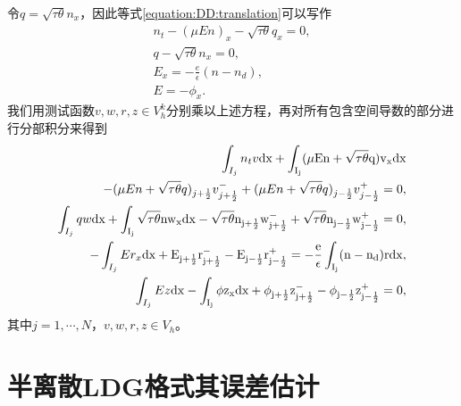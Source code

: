 令$q = \sqrt{\tau \theta }n_x$，因此等式\eqref{equation:DD:translation}可以写作
\begin{align}
    n_t - (\mu E n)_x - \sqrt{\tau \theta}q_x = 0, \\
    q - \sqrt{\tau \theta}n_x = 0,                 \\
    E_x = -\frac{e}{\epsilon}(n - n_d),            \\
    E = - \phi_x.
\end{align}
我们用测试函数$v,w,r,z \in V_h^k$分别乘以上述方程，再对所有包含空间导数的部分进行分部积分来得到
\begin{align}
    \int_{I_j} n_t v \rm{d}x + \int_{I_j}(\mu En + \sqrt{\tau \theta}q)v_x\rm{d} x          \nonumber                                                                                                                         \\
    - (\mu En + \sqrt{\tau \theta}q)_{j+\frac{1}{2}}v_{j+\frac{1}{2}}^- +(\mu En + \sqrt{\tau \theta}q)_{j-\frac{1}{2}}v_{j-\frac{1}{2}}^+ = 0, \label{weakForm:1:translation}                                                \\
    \int_{I_j} qw\rm{d}x + \int_{I_j}\sqrt{\tau \theta} n w_x \rm{d}x - \sqrt{\tau \theta} n_{j+\frac{1}{2}}w_{j+\frac{1}{2}}^- + \sqrt{\tau \theta} n_{j-\frac{1}{2}}w_{j-\frac{1}{2}}^+ = 0, \label{weakForm:2:translation} \\
    -\int_{I_j}Er_x\rm{d}x + E_{j+\frac{1}{2}}r_{j+\frac{1}{2}}^- - E_{j-\frac{1}{2}}r_{j-\frac{1}{2}}^+ = -\frac{e}{\epsilon}\int_{I_j}(n-n_d)r\rm{d}x,                                       \label{weakForm:3:translation} \\
    \int_{I_j} Ez \rm{d}x - \int_{I_j}\phi z_x \rm{d}x + \phi_{j+\frac{1}{2}}z_{j+\frac{1}{2}}^- - \phi_{j-\frac{1}{2}}z_{j-\frac{1}{2}}^+ = 0,\label{weakForm:4:translation}
\end{align}
其中$ j=1,\cdots,N$，$v,w,r,z \in V_h$。

\section{半离散LDG格式其误差估计}

